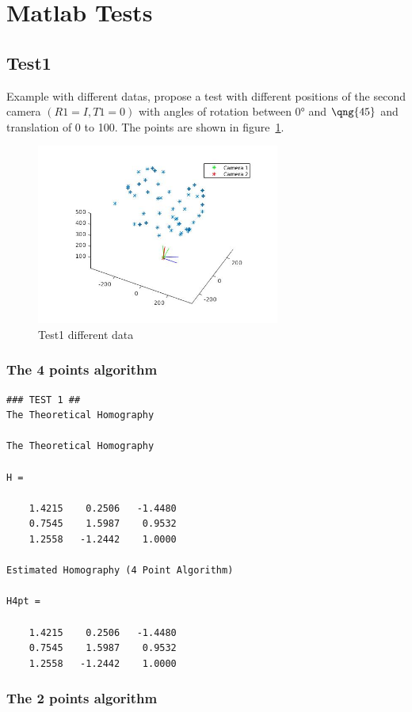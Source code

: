 \documentclass[a4paper,12pt]{article}
\begin{document}
\section{Matlab Tests}
\subsection{Test1}
Example with different datas, propose a test with different positions of the
second camera $(R1 = I, T1 = 0)$ with angles of rotation between $\ang{0}$ and $\qng{45}$ and
translation of 0 to 100. The points are shown in figure~\ref{fig:points-t1}.

\begin{figure}[tb]
         \centering
         \includegraphics[width=8cm]{Images/points3D.png}
         \caption{Test1 different data}
 	\label{fig:points-t1}
\end{figure}

\subsubsection{The 4 points algorithm}
\begin{verbatim}
### TEST 1 ##
The Theoretical Homography

The Theoretical Homography

H =

    1.4215    0.2506   -1.4480
    0.7545    1.5987    0.9532
    1.2558   -1.2442    1.0000

Estimated Homography (4 Point Algorithm)

H4pt =

    1.4215    0.2506   -1.4480
    0.7545    1.5987    0.9532
    1.2558   -1.2442    1.0000
\end{verbatim}


\subsubsection{The 2 points algorithm}
\end{document}
